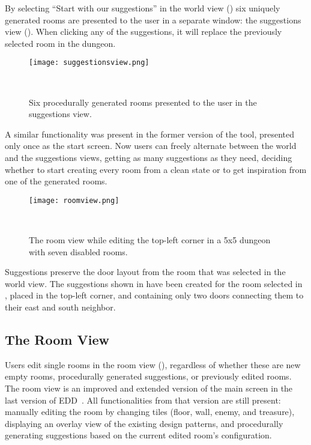 \documentclass[sigconf]{acmart}
\begin{document}
By selecting ``Start with our suggestions'' in the world view () six uniquely generated rooms are presented to the user in a separate window: the suggestions view (). When clicking any of the suggestions, it will replace the previously selected room in the dungeon.

\begin{figure}[!h]
    \centering
    \texttt{[image: suggestionsview.png]}
    \caption{Six procedurally generated rooms presented to the user in the suggestions view.}~\label{fig:suggestionsview}
\end{figure}

A similar functionality was present in the former version of the tool, presented only once as the start screen. Now users can freely alternate between the world and the suggestions views, getting as many suggestions as they need, deciding whether to start creating every room from a clean state or to get inspiration from one of the generated rooms.

\begin{figure*}[t]
    \centering
    \texttt{[image: roomview.png]}
    \caption{The room view while editing the top-left corner in a 5x5 dungeon with seven disabled rooms.}~\label{fig:roomview}
\end{figure*}

Suggestions preserve the door layout from the room that was selected in the world view. The suggestions shown in  have been created for the room selected in , placed in the top-left corner, and containing only two doors connecting them to their east and south neighbor.

\subsection{The Room View}



Users edit single rooms in the room view (), regardless of whether these are new empty rooms, procedurally generated suggestions, or previously edited rooms. The room view is an improved and extended version of the main screen in the last version of EDD~\cite{Eddy2}. All functionalities from that version are still present: manually editing the room by changing tiles (floor, wall, enemy, and treasure), displaying an overlay view of the existing design patterns, and procedurally generating suggestions based on the current edited room's configuration.
\end{document}
